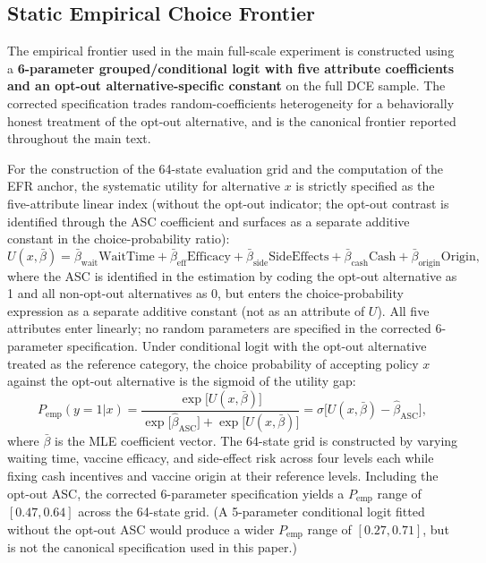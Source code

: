 \documentclass[11pt]{article}
\begin{document}
\subsection{Static Empirical Choice Frontier}

The empirical frontier used in the main full-scale experiment is constructed using a \textbf{6-parameter grouped/conditional logit with five attribute coefficients and an opt-out alternative-specific constant} on the full DCE sample. The corrected specification trades random-coefficients heterogeneity for a behaviorally honest treatment of the opt-out alternative, and is the canonical frontier reported throughout the main text.

For the construction of the 64-state evaluation grid and the computation of the EFR anchor, the systematic utility for alternative $x$ is strictly specified as the five-attribute linear index (without the opt-out indicator; the opt-out contrast is identified through the ASC coefficient and surfaces as a separate additive constant in the choice-probability ratio):
\[
U(x, \bar\beta) = \bar{\beta}_{\mathrm{wait}}\mathrm{WaitTime} + \bar{\beta}_{\mathrm{eff}}\mathrm{Efficacy} + \bar{\beta}_{\mathrm{side}}\mathrm{SideEffects} + \bar{\beta}_{\mathrm{cash}}\mathrm{Cash} + \bar{\beta}_{\mathrm{origin}}\mathrm{Origin},
\]
where the ASC is identified in the estimation by coding the opt-out alternative as 1 and all non-opt-out alternatives as 0, but enters the choice-probability expression as a separate additive constant (not as an attribute of $U$). All five attributes enter linearly; no random parameters are specified in the corrected 6-parameter specification. Under conditional logit with the opt-out alternative treated as the reference category, the choice probability of accepting policy $x$ against the opt-out alternative is the sigmoid of the utility gap:
\[
P_{\mathrm{emp}}(y=1|x) = \frac{\exp\!\bigl[U(x, \bar\beta)\bigr]}{\exp\!\bigl[\hat\beta_{\mathrm{ASC}}\bigr] + \exp\!\bigl[U(x, \bar\beta)\bigr]} = \sigma\!\bigl[U(x, \bar\beta) - \hat\beta_{\mathrm{ASC}}\bigr],
\]
where $\bar\beta$ is the MLE coefficient vector. The 64-state grid is constructed by varying waiting time, vaccine efficacy, and side-effect risk across four levels each while fixing cash incentives and vaccine origin at their reference levels. Including the opt-out ASC, the corrected 6-parameter specification yields a $P_{\mathrm{emp}}$ range of $[0.47, 0.64]$ across the 64-state grid. (A 5-parameter conditional logit fitted without the opt-out ASC would produce a wider $P_{\mathrm{emp}}$ range of $[0.27, 0.71]$, but is not the canonical specification used in this paper.)
\end{document}
